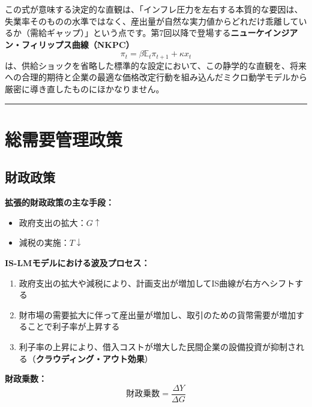 \documentclass[
  japanese,
  lualatex,
  ja=standard,
  12pt,
  a4paper]{ltjsarticle}
\providecommand{\tightlist}{%
  \setlength{\itemsep}{0pt}\setlength{\parskip}{0pt}}
\begin{document}
この式が意味する決定的な直観は、「インフレ圧力を左右する本質的な要因は、失業率そのものの水準ではなく、産出量が自然な実力値からどれだけ乖離しているか（需給ギャップ）」という点です。第7回以降で登場する\textbf{ニューケインジアン・フィリップス曲線（NKPC）}
\[
\pi_t=\beta\mathbb{E}_t\pi_{t+1}+\kappa x_t
\]
は、供給ショックを省略した標準的な設定において、この静学的な直観を、将来への合理的期待と企業の最適な価格改定行動を組み込んだミクロ動学モデルから厳密に導き直したものにほかなりません。

\begin{center}\rule{0.5\linewidth}{0.5pt}\end{center}


\section{総需要管理政策}\label{ux7dcfux9700ux8981ux7ba1ux7406ux653fux7b56}

\subsection{財政政策}\label{ux8ca1ux653fux653fux7b56}

\textbf{拡張的財政政策の主な手段：}

\begin{itemize}
\tightlist
\item
  政府支出の拡大：\(G \uparrow\)
\item
  減税の実施：\(T \downarrow\)
\end{itemize}


\textbf{IS-LMモデルにおける波及プロセス：}

\begin{enumerate}
\def\labelenumi{\arabic{enumi}.}
\tightlist
\item
  政府支出の拡大や減税により、計画支出が増加してIS曲線が右方へシフトする
\item
  財市場の需要拡大に伴って産出量が増加し、取引のための貨幣需要が増加することで利子率が上昇する
\item
  利子率の上昇により、借入コストが増大した民間企業の設備投資が抑制される（\textbf{クラウディング・アウト効果}）
\end{enumerate}


\textbf{財政乗数：} \[
\text{財政乗数} = \frac{\Delta Y}{\Delta G}
\]
\end{document}
